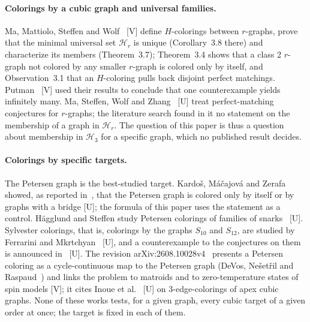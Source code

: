 \documentclass[11pt]{article}
\theoremstyle{definition}
\theoremstyle{remark}
\newcommand{\evV}{\textnormal{[V]}}
\newcommand{\evU}{\textnormal{[U]}}
\begin{document}
\paragraph{Colorings by a cubic graph and universal families.} Ma, Mattiolo, Steffen and
Wolf~\cite{MMSW2025} \evV{} define $H$-colorings between $r$-graphs, prove that the minimal universal set
$\mathcal{H}_r$ is unique (Corollary~3.8 there) and characterize its members (Theorem~3.7); Theorem~3.4 shows
that a class 2 $r$-graph not colored by any smaller $r$-graph is colored only by itself, and Observation~3.1 that an
$H$-coloring pulls back disjoint perfect matchings. Putman~\cite{Putman2026} \evV{} used their results to
conclude that one counterexample yields infinitely many. Ma, Steffen, Wolf and Zhang~\cite{MaSWZ2024}
\evU{} treat perfect-matching conjectures for $r$-graphs; the literature search found in it no statement on
the membership of a graph in $\mathcal{H}_r$. The question of this paper is thus a question about membership in
$\mathcal{H}_3$ for a specific graph, which no published result decides.

\paragraph{Colorings by specific targets.} The Petersen graph is the best-studied target. Kardo\v{s},
M\'a\v{c}ajov\'a and Zerafa~\cite{KardosMZ} showed, as reported in~\cite[Section~5.4]{GJMMMU2026}, that the Petersen graph is
colored only by itself or by graphs with a bridge \evU{}; the formula of this paper uses the statement as a control.
H\"agglund and Steffen study Petersen colorings of families of snarks~\cite{HagglundSteffen2014} \evU{}. Sylvester
colorings, that is, colorings by the graphs $S_{10}$ and $S_{12}$, are studied by Ferrarini and
Mkrtchyan~\cite{FerrariniMkrtchyan2026} \evU{}, and a counterexample to the conjectures on them is announced
in~\cite{S10S12counter} \evU{}. The revision arXiv:2608.10028v4~\cite{GJMMMU2026} presents a Petersen
coloring as a cycle-continuous map to the Petersen graph (DeVos, Ne\v{s}et\v{r}il and Raspaud~\cite{DeVosNR}) and links the problem to
matroids and to zero-temperature states of spin models \evV{}; it cites
Inoue et al.~\cite{InoueEtAl2026} \evU{} on 3-edge-colorings of apex cubic graphs. None of these works tests, for
a given graph, every cubic target of a given order at once; the target is fixed in each of them.
\end{document}
